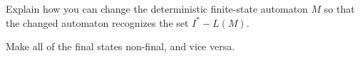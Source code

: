 \documentclass[../main.tex]{subfiles}
\begin{document}
Explain how you can change the deterministic finite-state automaton $M$ so that the changed automaton recognizes the set $I^\ast - L(M)$.

\solution
Make all of the final states non-final, and vice versa.
\end{document}
